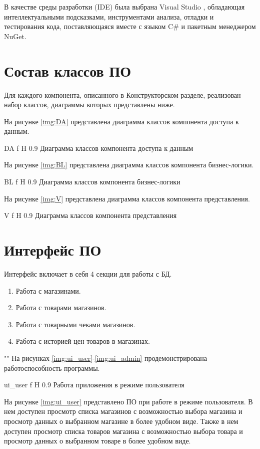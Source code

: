 \documentclass[a4paper]{bmstu}
\begin{document}
В качестве среды разработки (IDE) была выбрана Visual Studio \cite{vs}, обладающая интеллектуальными подсказками, инструментами анализа, отладки и тестирования кода, поставляющаяся вместе с языком C\# и пакетным менеджером NuGet.

\section{Состав классов ПО}

Для каждого компонента, описанного в Конструкторском разделе, реализован набор классов, диаграммы которых представлены ниже.

На рисунке \ref{img:DA} представлена диаграмма классов компонента доступа к данным.

	{DA}
	{f}
	{H}
	{0.9\textwidth}
	{Диаграмма классов компонента доступа к данным}
	
На рисунке \ref{img:BL} представлена диаграмма классов компонента бизнес-логики.

	{BL}
	{f}
	{H}
	{0.9\textwidth}
	{Диаграмма классов компонента бизнес-логики}

На рисунке \ref{img:V} представлена диаграмма классов компонента представления.

	{V}
	{f}
	{H}
	{0.9\textwidth}
	{Диаграмма классов компонента представления}	

\section{Интерфейс ПО}

Интерфейс включает в себя 4 секции для работы с БД.

\begin{enumerate}
	\item Работа с магазинами.
	\item Работа с товарами магазинов.
	\item Работа с товарными чеками магазинов.
	\item Работа с историей цен товаров в магазинах.
\end{enumerate}

""\newline\indent
На рисунках \ref{img:ui_user}-\ref{img:ui_admin} продемонстрирована работоспособность программы.


	{ui_user}
	{f}
	{H}
	{0.9\textwidth}
	{Работа приложения в режиме пользователя}

На рисунке \ref{img:ui_user} представлено ПО при работе в режиме пользователя. В нем доступен просмотр списка магазинов с возможностью выбора магазина и просмотр данных о выбранном магазине в более удобном виде. Также в нем доступен просмотр списка товаров магазина с возможностью выбора товара и просмотр данных о выбранном товаре в более удобном виде.
\end{document}
